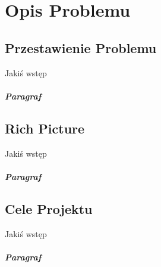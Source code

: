 
\chapter{Opis Problemu}
\label{ch:opis_problemu}


\section{Przestawienie Problemu}
\label{sec:przestawienie_problemu}
Jakiś wstęp

\paragraph{Paragraf}


\section{Rich Picture}
\label{sec:rich_picture}
Jakiś wstęp

\paragraph{Paragraf}


\section{Cele Projektu}
\label{sec:cele_projektu}
Jakiś wstęp

\paragraph{Paragraf}




